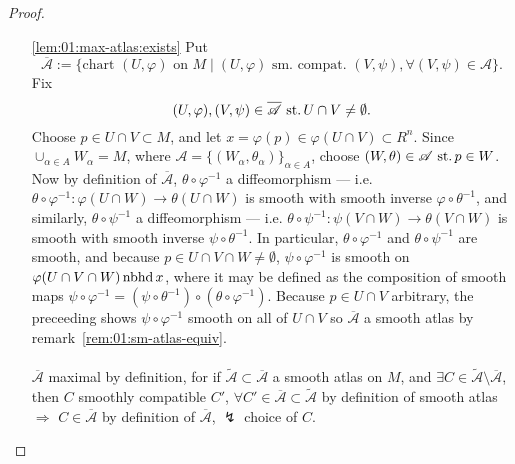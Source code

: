 \begin{proof}\
  \begin{itemize}
  \item[\ref{lem:01:max-atlas:exists}]
    Put
    \[
    \overline{\mathscr A}:=
    \{\text{chart } (U,\varphi)\text{ on } M\mid
    (U,\varphi)\text{ sm. compat. }
    (V,\psi),\forall(V,\psi)\in\mathscr A\}.
    \]
    Fix
    \[
    (U,\varphi), (V,\psi)\in \overline{\mathscr A}
    \operatorname{\,st.} U\cap V\neq \emptyset.
    \]
    Choose $p\in U\cap V\subset M$, and let
    $x=\varphi(p)\in\varphi(U\cap V)\subset R^n$.
    Since $\cup_{\alpha\in A} W_\alpha = M$,
    where $\mathscr A=\{(W_\alpha,\theta_\alpha)\}_{\alpha\in A}$,
    choose $(W,\theta)\in\mathscr A\operatorname{\,st.} p\in W$.
    Now by definition of $\overline{\mathscr A}$,
    $\theta\circ\varphi^{-1}$ a diffeomorphism --- i.e.
    $\theta\circ\varphi^{-1}: \varphi(U\cap W)\rightarrow\theta(U\cap W)$
    is smooth with smooth inverse $\varphi\circ\theta^{-1}$,
    and similarly,
    $\theta\circ\psi^{-1}$ a diffeomorphism --- i.e.
    $\theta\circ\psi^{-1}: \psi(V\cap W)\rightarrow\theta(V\cap W)$
    is smooth with smooth inverse $\psi\circ\theta^{-1}$.
    In particular, $\theta\circ\varphi^{-1}$ and $\theta\circ\psi^{-1}$
    are smooth, and because $p\in U\cap V\cap W\neq\emptyset$,
    $\psi\circ\varphi^{-1}$ is smooth on
    $\varphi(U\cap V\cap W)\operatorname{nbhd} x$,
    where it may be defined as
    the composition of smooth maps
    $\psi\circ\varphi^{-1} = (\psi\circ\theta^{-1})\circ(\theta\circ\varphi^{-1})$.
    Because $p\in U\cap V$ arbitrary, the preceeding shows
    $\psi\circ\varphi^{-1}$ smooth on all of $U\cap V$
    so $\overline{\mathscr A}$ a smooth atlas by
    remark~\ref{rem:01:sm-atlas-equiv}.
    \paragraph{}
    $\overline{\mathscr A}$ maximal by definition, for if
    $\widetilde{\mathscr A}\subset\overline{\mathscr A}$
    a smooth atlas on $M$, and
    $\exists C\in \widetilde{\mathscr A}\setminus\overline{\mathscr A}$,
    then $C$ smoothly compatible $C'$,
    $\forall C'\in\overline{\mathscr A}\subset\widetilde{\mathscr A}$
    by definition of smooth atlas $\Rightarrow$
    $C\in\overline{\mathscr A}$ by definition of
    $\overline{\mathscr A}$,
    $\lightning$ choice of $C$.

\end{itemize}
\end{proof}

